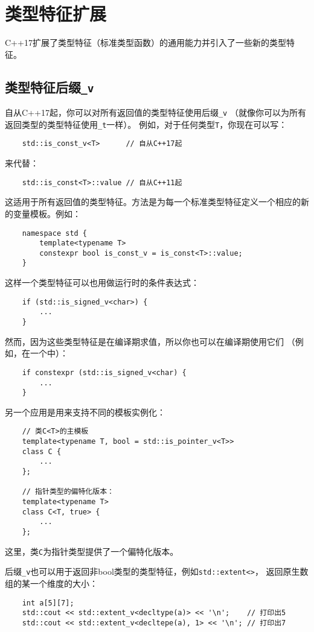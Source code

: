\chapter{类型特征扩展}\label{ch21}
C++17扩展了类型特征（标准类型函数）的通用能力并引入了一些新的类型特征。


\section{类型特征后缀\texttt{\_v}}\label{ch21.1}
自从C++17起，你可以对所有返回值的类型特征使用后缀\texttt{\_v}
（就像你可以为所有返回类型的类型特征使用\texttt{\_t}一样）。
例如，对于任何类型\texttt{T}，你现在可以写：
\begin{lstlisting}
    std::is_const_v<T>      // 自从C++17起
\end{lstlisting}
来代替：
\begin{lstlisting}
    std::is_const<T>::value // 自从C++11起
\end{lstlisting}
这适用于所有返回值的类型特征。方法是为每一个标准类型特征定义一个相应的新的变量模板。例如：
\begin{lstlisting}
    namespace std {
        template<typename T>
        constexpr bool is_const_v = is_const<T>::value;
    }
\end{lstlisting}
这样一个类型特征可以也用做运行时的条件表达式：
\begin{lstlisting}
    if (std::is_signed_v<char>) {
        ...
    }
\end{lstlisting}
然而，因为这些类型特征是在编译期求值，所以你也可以在编译期使用它们
（例如，在一个中）：
\begin{lstlisting}
    if constexpr (std::is_signed_v<char) {
        ...
    }
\end{lstlisting}
另一个应用是用来支持不同的模板实例化：
\begin{lstlisting}
    // 类C<T>的主模板
    template<typename T, bool = std::is_pointer_v<T>>
    class C {
        ...
    };

    // 指针类型的偏特化版本：
    template<typename T>
    class C<T, true> {
        ...
    };
\end{lstlisting}
这里，类\texttt{C}为指针类型提供了一个偏特化版本。

后缀\texttt{\_v}也可以用于返回非bool类型的类型特征，例如\texttt{std::extent<>}，
返回原生数组的某一个维度的大小：
\begin{lstlisting}
    int a[5][7];
    std::cout << std::extent_v<decltype(a)> << '\n';    // 打印出5
    std::cout << std::extent_v<decltepe(a), 1> << '\n'; // 打印出7
\end{lstlisting}


